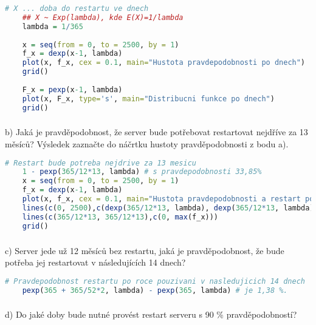 \documentclass{article}%
\begin{document}
\begin{lstlisting}[language=R, showstringspaces=false, basicstyle=\small]
    # X ... doba do restartu ve dnech
    ## X ~ Exp(lambda), kde E(X)=1/lambda
    lambda = 1/365
    
    x = seq(from = 0, to = 2500, by = 1)
    f_x = dexp(x-1, lambda)
    plot(x, f_x, cex = 0.1, main="Hustota pravdepodobnosti po dnech")
    grid()
    
    F_x = pexp(x-1, lambda)
    plot(x, F_x, type='s', main="Distribucni funkce po dnech")
    grid()  
\end{lstlisting}

\subsubsection{}
b) Jaká je pravděpodobnost, že server bude potřebovat restartovat nejdříve za 13 měsíců? Výsledek zaznačte do náčrtku hustoty pravděpodobnosti z bodu a). 

\begin{lstlisting}[language=R, showstringspaces=false, basicstyle=\small]
    # Restart bude potreba nejdrive za 13 mesicu
    1 - pexp(365/12*13, lambda) # s pravdepodobnosti 33,85%
    x = seq(from = 0, to = 2500, by = 1)
    f_x = dexp(x-1, lambda)
    plot(x, f_x, cex = 0.1, main="Hustota pravdepodobnosti a restart po 13 mesicich")
    lines(c(0, 2500),c(dexp(365/12*13, lambda), dexp(365/12*13, lambda)))
    lines(c(365/12*13, 365/12*13),c(0, max(f_x)))
    grid()
\end{lstlisting}

\subsubsection{}
c) Server jede už 12 měsíců bez restartu, jaká je pravděpodobnost, že bude potřeba jej restartovat v následujících 14 dnech?

\begin{lstlisting}[language=R, showstringspaces=false, basicstyle=\small]
    # Pravdepodobnost restartu po roce pouzivani v nasledujicich 14 dnech
    pexp(365 + 365/52*2, lambda) - pexp(365, lambda) # je 1,38 %.
\end{lstlisting}

\subsubsection{}
d) Do jaké doby bude nutné provést restart serveru s 90 \% pravděpodobností?
\end{document}
